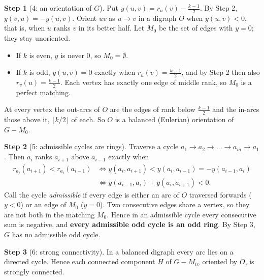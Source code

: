 \documentclass[11pt]{article}
\theoremstyle{plain}
\theoremstyle{definition}
\newtheorem*{step}{Step}
\begin{document}
\begin{step}[4: an orientation of $G$]
Put $y(u,v) = r_u(v) - \tfrac{k-1}{2}$. By Step 2, $y(v,u) = -y(u,v)$. Orient $uv$ as
$u \to v$ in a digraph $O$ when $y(u,v) < 0$, that is, when $u$ ranks $v$ in its better half.
Let $M_0$ be the set of edges with $y = 0$; they stay unoriented.
\begin{itemize}[nosep]
  \item If $k$ is even, $y$ is never $0$, so $M_0 = \emptyset$.
  \item If $k$ is odd, $y(u,v) = 0$ exactly when $r_u(v) = \tfrac{k-1}{2}$, and by Step 2 then
        also $r_v(u) = \tfrac{k-1}{2}$. Each vertex has exactly one edge of middle rank, so $M_0$
        is a perfect matching.
\end{itemize}
At every vertex the out-arcs of $O$ are the edges of rank below $\tfrac{k-1}{2}$ and the
in-arcs those above it, $\lfloor k/2 \rfloor$ of each. So $O$ is a balanced (Eulerian)
orientation of $G - M_0$.
\end{step}

\begin{step}[5: admissible cycles are rings]
Traverse a cycle $a_1 \to a_2 \to \dots \to a_m \to a_1$. Then $a_i$ ranks $a_{i+1}$ above
$a_{i-1}$ exactly when
\begin{align*}
  r_{a_i}(a_{i+1}) < r_{a_i}(a_{i-1})
  &\iff y(a_i, a_{i+1}) < y(a_i, a_{i-1}) = -y(a_{i-1}, a_i)\\
  &\iff y(a_{i-1}, a_i) + y(a_i, a_{i+1}) < 0.
\end{align*}
Call the cycle \emph{admissible} if every edge is either an arc of $O$ traversed forwards
($y < 0$) or an edge of $M_0$ ($y = 0$). Two consecutive edges share a vertex, so they are not
both in the matching $M_0$. Hence in an admissible cycle every consecutive sum is negative, and
\textbf{every admissible odd cycle is an odd ring}. By Step 3, $G$ has no admissible odd cycle.
\end{step}

\begin{step}[6: strong connectivity]
In a balanced digraph every arc lies on a directed cycle. Hence each connected component $H$
of $G - M_0$, oriented by $O$, is strongly connected.
\end{step}
\end{document}
